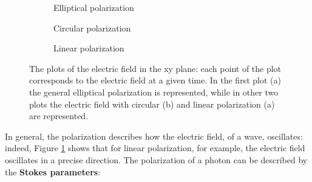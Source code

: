 \begin{figure}[h]
    \centering
    \begin{subfigure}[b]{0.3\textwidth}
        \centering
        \caption{Elliptical polarization}
    \end{subfigure}
    \hfill
    \begin{subfigure}[b]{0.3\textwidth}
        \centering
        \caption{Circular polarization}
    \end{subfigure}
    \hfill
    \begin{subfigure}[b]{0.3\textwidth}
        \centering
        \caption{Linear polarization}
    \end{subfigure}
    \caption{The plots of the electric field in the xy plane: each point of the plot corresponds to the electric field at a given time. In the first plot (a) the general elliptical polarization is represented, while in other two plots the electric field with circular (b) and linear polarization (a) are represented.}
    \label{fig:E_polarization}
\end{figure}
In general, the polarization describes how the electric field, of a wave, oscillates: indeed, Figure \ref{fig:E_polarization} shows that for linear polarization, for example, the electric field oscillates in a precise direction. The polarization of a photon can be described by the \textbf{Stokes parameters}:
